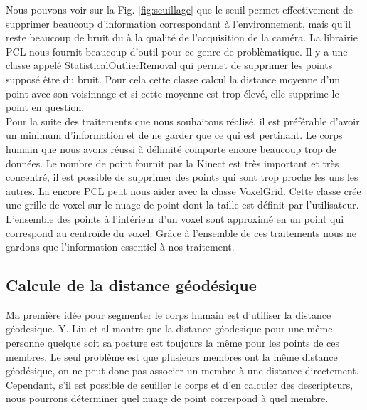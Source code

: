 Nous pouvons voir sur la Fig. \ref{fig:seuillage} que le seuil permet effectivement de supprimer beaucoup d'information
correspondant à l'environnement, mais qu'il reste beaucoup de bruit du à la qualité de l'acquisition de la caméra. La librairie
PCL\cite{PCL} nous fournit beaucoup d'outil pour ce genre de problèmatique. Il y a une classe appelé StatisticalOutlierRemoval
qui permet de supprimer les points supposé être du bruit. Pour cela cette classe calcul la distance moyenne d'un point avec son
voisinnage et si cette moyenne est trop élevé, elle supprime le point en question.\\


Pour la suite des traitements que nous souhaitons réalisé, il est préférable d'avoir un minimum d'information et de ne garder
que ce qui est pertinant. Le corps humain que nous avons réussi à délimité comporte encore beaucoup trop de données. Le nombre
de point fournit par la Kinect est très important et très concentré, il est possible de supprimer des points qui sont trop 
proche les uns les autres. La encore PCL\cite{PCL} peut nous aider avec la classe VoxelGrid. Cette classe crée une grille de
voxel sur le nuage de point dont la taille est définit par l'utilisateur. L'ensemble des points à l'intérieur d'un voxel sont 
approximé en un point qui correspond au centroïde du voxel. Grâce à l'ensemble de ces traitements nous ne gardons que l'information 
essentiel à nos traitement.

\subsection{Calcule de la distance géodésique}
Ma première idée pour segmenter le corps humain est d'utiliser la distance géodesique. Y. Liu et al\cite{GIF} montre que la distance
géodesique pour une même personne quelque soit sa posture est toujours la même pour les points de ces membres. Le seul problème 
est que plusieurs membres ont la même distance géodésique, on ne peut donc pas associer un membre à une distance directement.
Cependant, s'il est possible de seuiller le corps et d'en calculer des descripteurs, nous pourrons déterminer quel nuage de point
correspond à quel membre.\\

